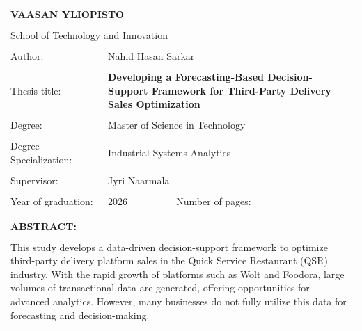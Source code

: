 {
\begin{table}[!ht]
\fontsize{11pt}{11pt}\selectfont
{}

\begin{tabular}{llll}
\hline

\multicolumn{4}{l}{\textbf{VAASAN YLIOPISTO}} \\ \\
\multicolumn{4}{l}{School of Technology and Innovation} \\ \\

Author: &
\multicolumn{3}{l}{Nahid Hasan Sarkar} \\ \\

Thesis title: &
\multicolumn{3}{l}{\textbf{Developing a Forecasting-Based Decision-Support Framework for Third-Party Delivery Sales Optimization}} \\ \\

Degree: &
\multicolumn{3}{l}{Master of Science in Technology} \\ \\

Degree Specialization: &
\multicolumn{3}{l}{Industrial Systems Analytics} \\ \\

Supervisor: &
\multicolumn{3}{l}{Jyri Naarmala} \\ \\

Year of graduation: &
2026 &
Number of pages: &
\pageref{LastPage} \\                                                               \\

\hline
\\
\multicolumn{4}{l}{\textbf{ABSTRACT:}}                                               \\ \\

\multicolumn{4}{p{14.5cm}}{

This study develops a data-driven decision-support framework to optimize third-party delivery platform sales in the Quick Service Restaurant (QSR) industry. With the rapid growth of platforms such as Wolt and Foodora, large volumes of transactional data are generated, offering opportunities for advanced analytics. However, many businesses do not fully utilize this data for forecasting and decision-making.

}
\end{tabular}
\end{table}}
